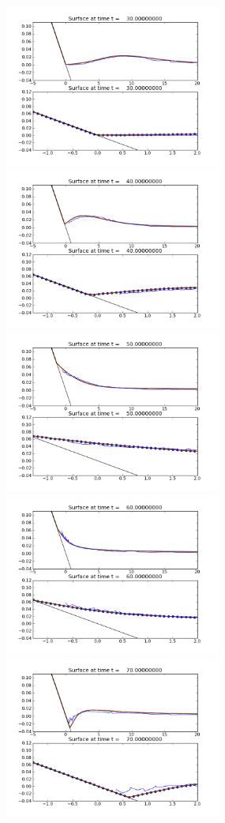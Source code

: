 \begin{figure}[ht]
\hfil\includegraphics[width=2.8in]{bp4/lab-185/frame0001fig2.png}\hfil
\hfil\includegraphics[width=2.8in]{bp4/lab-185/frame0002fig2.png}\hfil
\vskip 5pt
\hfil\includegraphics[width=2.8in]{bp4/lab-185/frame0003fig2.png}\hfil
\hfil\includegraphics[width=2.8in]{bp4/lab-185/frame0004fig2.png}\hfil
\vskip 5pt
\hfil\includegraphics[width=2.8in]{bp4/lab-185/frame0005fig2.png}\hfil

\end{figure}
